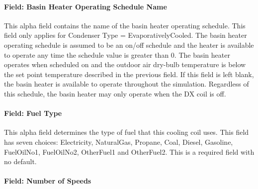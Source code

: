 \paragraph{Field: Basin Heater Operating Schedule Name}\label{field-basin-heater-operating-schedule-name-3-000}

This alpha field contains the name of the basin heater operating schedule. This field only applies for Condenser Type = EvaporativelyCooled. The basin heater operating schedule is assumed to be an on/off schedule and the heater is available to operate any time the schedule value is greater than 0. The basin heater operates when scheduled on and the outdoor air dry-bulb temperature is below the set point temperature described in the previous field. If this field is left blank, the basin heater is available to operate throughout the simulation. Regardless of this schedule, the basin heater may only operate when the DX coil is off.

\paragraph{Field: Fuel Type}\label{field-fuel-type-000}

This alpha field determines the type of fuel that this cooling coil uses. This field has seven choices: Electricity, NaturalGas, Propane, Coal, Diesel, Gasoline, FuelOilNo1, FuelOilNo2, OtherFuel1 and OtherFuel2. This is a required field with no default.

\paragraph{Field: Number of Speeds}\label{field-number-of-speeds}

